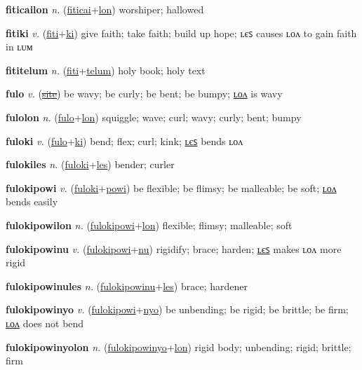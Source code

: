 \textbf{\hypertarget{fiticailon}{fiticailon}} \textit{n.} (\hyperlink{fiticai}{fiticai}+\allowbreak \hyperlink{lon}{lon})
worshiper; hallowed

\textbf{\hypertarget{fitiki}{fitiki}} \textit{v.} (\hyperlink{fiti}{fiti}+\allowbreak \hyperlink{ki}{ki})
give faith; take faith; build up hope; ʟєꜱ causes ʟᴏᴧ to gain faith in ʟᴜᴍ

\textbf{\hypertarget{fititelum}{fititelum}} \textit{n.} (\hyperlink{fiti}{fiti}+\allowbreak \hyperlink{telum}{telum})
holy book; holy text

\textbf{\hypertarget{fulo}{fulo}} \textit{v.} (\hyperlink{site}{\sout{site}})
be wavy; be curly; be bent; be bumpy; \hyperlink{fulolon}{ʟᴏᴧ} is wavy

\textbf{\hypertarget{fulolon}{fulolon}} \textit{n.} (\hyperlink{fulo}{fulo}+\allowbreak \hyperlink{lon}{lon})
squiggle; wave; curl; wavy; curly; bent; bumpy

\textbf{\hypertarget{fuloki}{fuloki}} \textit{v.} (\hyperlink{fulo}{fulo}+\allowbreak \hyperlink{ki}{ki})
bend; flex; curl; kink; \hyperlink{fulokiles}{ʟєꜱ} bends ʟᴏᴧ

\textbf{\hypertarget{fulokiles}{fulokiles}} \textit{n.} (\hyperlink{fuloki}{fuloki}+\allowbreak \hyperlink{les}{les})
bender; curler

\textbf{\hypertarget{fulokipowi}{fulokipowi}} \textit{v.} (\hyperlink{fuloki}{fuloki}+\allowbreak \hyperlink{powi}{powi})
be flexible; be flimsy; be malleable; be soft; \hyperlink{fulokipowilon}{ʟᴏᴧ} bends easily

\textbf{\hypertarget{fulokipowilon}{fulokipowilon}} \textit{n.} (\hyperlink{fulokipowi}{fulokipowi}+\allowbreak \hyperlink{lon}{lon})
flexible; flimsy; malleable; soft

\textbf{\hypertarget{fulokipowinu}{fulokipowinu}} \textit{v.} (\hyperlink{fulokipowi}{fulokipowi}+\allowbreak \hyperlink{nu}{nu})
rigidify; brace; harden; \hyperlink{fulokipowinules}{ʟєꜱ} makes ʟᴏᴧ more rigid

\textbf{\hypertarget{fulokipowinules}{fulokipowinules}} \textit{n.} (\hyperlink{fulokipowinu}{fulokipowinu}+\allowbreak \hyperlink{les}{les})
brace; hardener

\textbf{\hypertarget{fulokipowinyo}{fulokipowinyo}} \textit{v.} (\hyperlink{fulokipowi}{fulokipowi}+\allowbreak \hyperlink{nyo}{nyo})
be unbending; be rigid; be brittle; be firm; \hyperlink{fulokipowinyolon}{ʟᴏᴧ} does not bend

\textbf{\hypertarget{fulokipowinyolon}{fulokipowinyolon}} \textit{n.} (\hyperlink{fulokipowinyo}{fulokipowinyo}+\allowbreak \hyperlink{lon}{lon})
rigid body; unbending; rigid; brittle; firm

